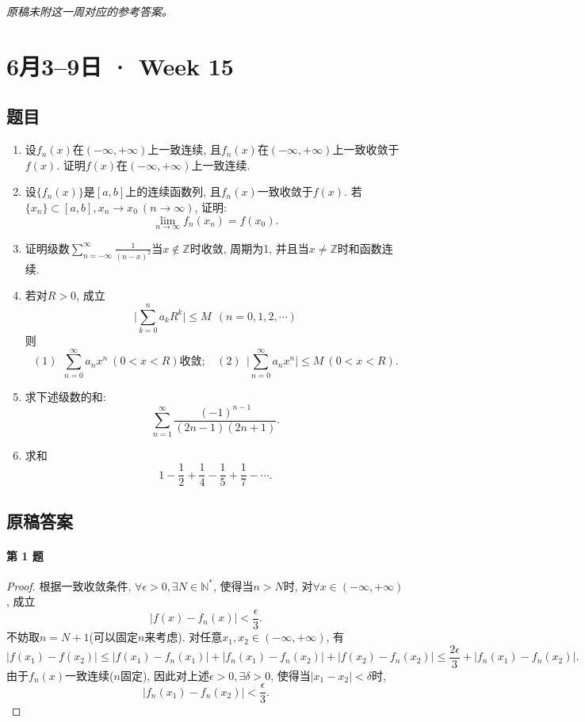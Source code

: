 \documentclass[UTF8,11pt, a4paper, oneside, fontset=none]{ctexbook}
\begin{document}
\noindent\emph{原稿未附这一周对应的参考答案。}

\clearpage

\section{6月3--9日 · Week 15}

\subsection*{题目}

\begin{enumerate}

\item 设$f_n(x)$在$(-\infty, +\infty)$上一致连续, 且$f_n(x)$在$(-\infty, +\infty)$上一致收敛于$f(x)$. 证明$f(x)$在$(-\infty, +\infty)$上一致连续.

\item 设$\{ f_n(x) \}$是$[a, b]$上的连续函数列, 且$f_n(x)$一致收敛于$f(x)$. 若$\{ x_n \} \subset [a, b], x_n \to x_0 \ (n \to \infty)$, 证明:
\[
\lim_{n \to \infty} f_n(x_n) = f(x_0).
\]

\item 证明级数$\sum_{n=-\infty}^{\infty} \frac{1}{(n-x)^2}$当$x \notin \mathbb Z$时收敛, 周期为1, 并且当$x \neq \mathbb Z$时和函数连续.

\item 若对$R>0$, 成立
\[
\Big| \sum_{k=0}^n a_k R^k \Big| \leq M \ \ (n=0, 1, 2, \cdots)
\]
则
\[
(1) \ \  \sum_{n=0}^{\infty} a_n x^n \ (0 < x < R)\mbox{收敛}; \ \ \ \ (2) \ \  \Big| \sum_{n=0}^{\infty} a_n x^n \Big| \leq M \ (0 < x < R).
\]

\item 求下述级数的和:
\[
\sum_{n=1}^{\infty} \frac{(-1)^{n-1}}{(2n-1)(2n+1)}.
\]

\item 求和
\[
1 - \frac{1}{2} + \frac{1}{4} - \frac{1}{5} + \frac{1}{7} -  \cdots.
\]

\end{enumerate}

\clearpage

\subsection*{原稿答案}

\paragraph{第 1 题}
\begin{proof}

根据一致收敛条件, $\forall \epsilon >0, \exists N \in \mathbb N^*$, 使得当$n >N$时, 对$\forall x \in (-\infty, +\infty)$, 成立
\[
|f(x) - f_n(x)| < \frac{\epsilon}{3}.
\]
不妨取$n = N+1$(可以固定$n$来考虑). 对任意$x_1, x_2 \in (-\infty, +\infty)$, 有
\[
|f(x_1) - f(x_2)| \leq |f(x_1) - f_n(x_1)| + |f_n(x_1) - f_n(x_2)| + |f(x_2) - f_n(x_2)| \leq \frac{2\epsilon}{3} + |f_n(x_1) - f_n(x_2)|.
\]
由于$f_n(x)$一致连续($n$固定), 因此对上述$\epsilon >0, \exists \delta >0$, 使得当$|x_1 - x_2|<\delta$时, 
\[
|f_n(x_1) - f_n(x_2)| < \frac{\epsilon}{3}.
\]

\end{proof}
\end{document}

